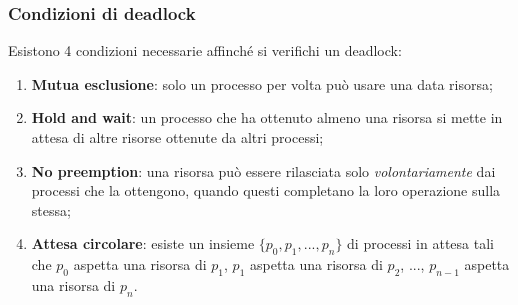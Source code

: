 \documentclass[a4paper,11pt]{article}
\begin{document}
\subsubsection{Condizioni di deadlock}
Esistono 4 condizioni necessarie affinché si verifichi un deadlock:
\begin{enumerate}
	\item \textbf{Mutua esclusione}: solo un processo per volta può usare una data risorsa;
	\item \textbf{Hold and wait}: un processo che ha ottenuto almeno una risorsa si mette in attesa di altre risorse ottenute da altri processi;
	\item \textbf{No preemption}: una risorsa può essere rilasciata solo \textit{volontariamente} dai processi che la ottengono, quando questi completano la loro operazione sulla stessa;
	\item \textbf{Attesa circolare}: esiste un insieme $\{p_0, p_1, ..., p_n \}$ di processi in attesa tali che $p_0$ aspetta una risorsa di $p_1$, $p_1$ aspetta una risorsa di $p_2$, ..., $p_{n - 1}$ aspetta una risorsa di $p_n$.
\end{enumerate}
\end{document}
